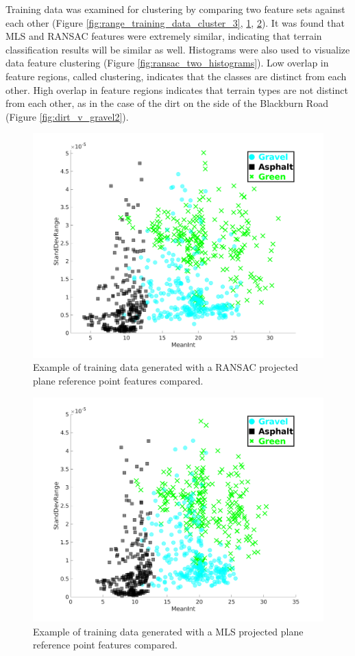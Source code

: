 \documentclass[numbered,pdftex]{ohio-etd}
\begin{document}
{{		{Training data was examined for clustering by comparing two feature sets against each other (Figure \ref{fig:range_training_data_cluster_3}, \ref{fig:ransac_training_data_cluster}, \ref{fig:mls_training_data_cluster}). It was found that MLS and RANSAC features were extremely similar, indicating that terrain classification results will be similar as well. Histograms were also used to visualize data feature clustering (Figure \ref{fig:ransac_two_histograms}). Low overlap in feature regions, called clustering, indicates that the classes are distinct from each other. High overlap in feature regions indicates that terrain types are not distinct from each other, as in the case of the dirt on the side of the Blackburn Road (Figure \ref{fig:dirt_v_gravel2}). }
		
		\begin{figure}[H]
			\centering
			\includegraphics[width=0.65\linewidth]{Defense_Images/ransac_training_data_cluster}
			\caption[Example RANSAC Clustering]{Example of training data generated with a RANSAC projected plane reference point features compared.}
			\label{fig:ransac_training_data_cluster}
		\end{figure}
	
		\begin{figure}[H]
			\centering
			\includegraphics[width=0.65\linewidth]{Defense_Images/mls_training_data_cluster}
			\caption[Example MLS Clustering]{Example of training data generated with a MLS projected plane reference point features compared.}
			\label{fig:mls_training_data_cluster}
		\end{figure}
	
}}
\end{document}
